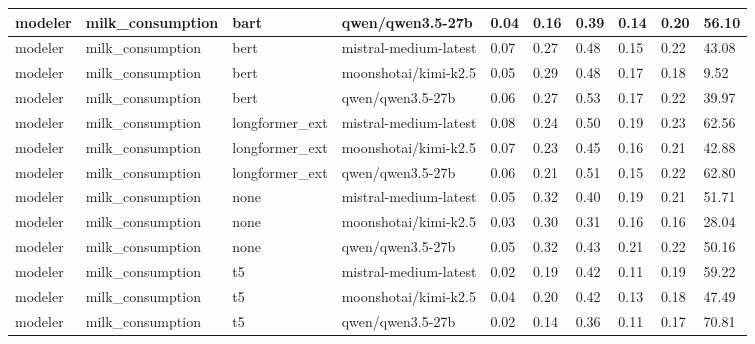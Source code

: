 \begin{tabular}{|l|l|l|l|l|l|l|l|l|l|}
 \hline
 modeler & milk\_consumption & bart & qwen/qwen3.5-27b & 0.04 & 0.16 & 0.39 & 0.14 & 0.20 & 56.10 \\
 \hline
 modeler & milk\_consumption & bert & mistral-medium-latest & 0.07 & 0.27 & 0.48 & 0.15 & 0.22 & 43.08 \\
 \hline
 modeler & milk\_consumption & bert & moonshotai/kimi-k2.5 & 0.05 & 0.29 & 0.48 & 0.17 & 0.18 & 9.52 \\
 \hline
 modeler & milk\_consumption & bert & qwen/qwen3.5-27b & 0.06 & 0.27 & 0.53 & 0.17 & 0.22 & 39.97 \\
 \hline
 modeler & milk\_consumption & longformer\_ext & mistral-medium-latest & 0.08 & 0.24 & 0.50 & 0.19 & 0.23 & 62.56 \\
 \hline
 modeler & milk\_consumption & longformer\_ext & moonshotai/kimi-k2.5 & 0.07 & 0.23 & 0.45 & 0.16 & 0.21 & 42.88 \\
 \hline
 modeler & milk\_consumption & longformer\_ext & qwen/qwen3.5-27b & 0.06 & 0.21 & 0.51 & 0.15 & 0.22 & 62.80 \\
 \hline
 modeler & milk\_consumption & none & mistral-medium-latest & 0.05 & 0.32 & 0.40 & 0.19 & 0.21 & 51.71 \\
 \hline
 modeler & milk\_consumption & none & moonshotai/kimi-k2.5 & 0.03 & 0.30 & 0.31 & 0.16 & 0.16 & 28.04 \\
 \hline
 modeler & milk\_consumption & none & qwen/qwen3.5-27b & 0.05 & 0.32 & 0.43 & 0.21 & 0.22 & 50.16 \\
 \hline
 modeler & milk\_consumption & t5 & mistral-medium-latest & 0.02 & 0.19 & 0.42 & 0.11 & 0.19 & 59.22 \\
 \hline
 modeler & milk\_consumption & t5 & moonshotai/kimi-k2.5 & 0.04 & 0.20 & 0.42 & 0.13 & 0.18 & 47.49 \\
 \hline
 modeler & milk\_consumption & t5 & qwen/qwen3.5-27b & 0.02 & 0.14 & 0.36 & 0.11 & 0.17 & 70.81 \\
\hline
\end{tabular}
